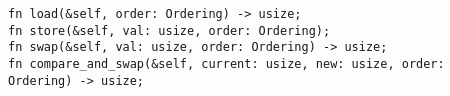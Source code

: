 \begin{lstlisting}[label=lst:atomicusize,caption=Signatures for selected operations on
\code{AtomicUsize}]
fn load(&self, order: Ordering) -> usize;
fn store(&self, val: usize, order: Ordering);
fn swap(&self, val: usize, order: Ordering) -> usize;
fn compare_and_swap(&self, current: usize, new: usize, order: Ordering) -> usize;
\end{lstlisting}

